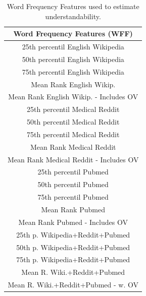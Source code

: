 \documentclass[10pt,a4paper]{article}
\begin{document}
\begin{table}[!tb]
	\centering    
	\caption{Statistics for the corpora used as background models for understandability estimations.}
	\label{tab:collection_stats}
\end{table}

\begin{table}
\caption{Word Frequency Features used to estimate understandability.}
\label{tab:doc_features_wff} \vspace{-10pt}
\begin{tabular}{c}
\toprule 
\textbf{Word Frequency Features (WFF)}\tabularnewline
\midrule 
25th percentil English Wikipedia\tabularnewline
50th percentil English Wikipedia\tabularnewline
75th percentil English Wikipedia\tabularnewline
Mean Rank English Wikip.\tabularnewline
Mean Rank English Wikip. - Includes OV\tabularnewline
25th percentil Medical Reddit\tabularnewline
50th percentil Medical Reddit\tabularnewline
75th percentil Medical Reddit\tabularnewline
Mean Rank Medical Reddit\tabularnewline
Mean Rank Medical Reddit - Includes OV\tabularnewline
25th percentil Pubmed\tabularnewline
50th percentil Pubmed\tabularnewline
75th percentil Pubmed\tabularnewline
Mean Rank Pubmed\tabularnewline
Mean Rank Pubmed - Includes OV\tabularnewline
25th p. Wikipedia+Reddit+Pubmed \tabularnewline
50th p. Wikipedia+Reddit+Pubmed \tabularnewline
75th p. Wikipedia+Reddit+Pubmed \tabularnewline
Mean R. Wiki.+Reddit+Pubmed \tabularnewline
Mean R. Wiki.+Reddit+Pubmed - w. OV \tabularnewline
\bottomrule
\end{tabular}
\end{table}
\end{document}

